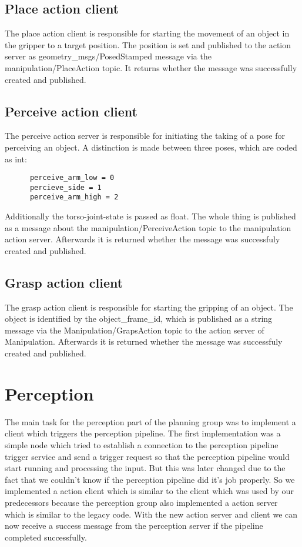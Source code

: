 \documentclass[main.tex]{subfiles}
\begin{document}
		\subsection{Place action client}

    The place action client is responsible for starting the movement of an object in the gripper to a target position. The position is set and published to the action server as geometry\_msgs/PosedStamped message via the manipulation/PlaceAction topic. It returns whether the message was successfully created and published.

    \subsection{Perceive action client}

		The perceive action server is responsible for initiating the taking of a pose for perceiving an object. A distinction is made between three poses, which are coded as int: 
		\begin{lstlisting}
      perceive_arm_low = 0
      percieve_side = 1
      perceive_arm_high = 2
		\end{lstlisting}
Additionally the torso-joint-state is passed as float.
The whole thing is published as a message about the manipulation/PerceiveAction topic to the manipulation action server. Afterwards it is returned whether the message was successfuly created and published.

		\subsection{Grasp action client}

		The grasp action client is responsible for starting the gripping of an object. The object is identified by the object\_frame\_id, which is published as a string message via the Manipulation/GrapsAction topic to the action server of Manipulation. Afterwards it is returned whether the message was successfuly created and published.

		\section{Perception}

		The main task for the perception part of the planning group was to implement a client which triggers the perception pipeline.
		The first implementation was a simple node which tried to establish a connection to the perception pipeline trigger service and send a trigger request so that the perception pipeline would start running and processing the input. But this was later changed due to the fact that we couldn't know if the perception pipeline did it's job properly.
		So we implemented a action client which is similar to the client which was used by our predecessors because the perception group also implemented a action server which is similar to the legacy code. With the new action server and client we can now receive a success message from the perception server if the pipeline completed successfully.
\end{document}
